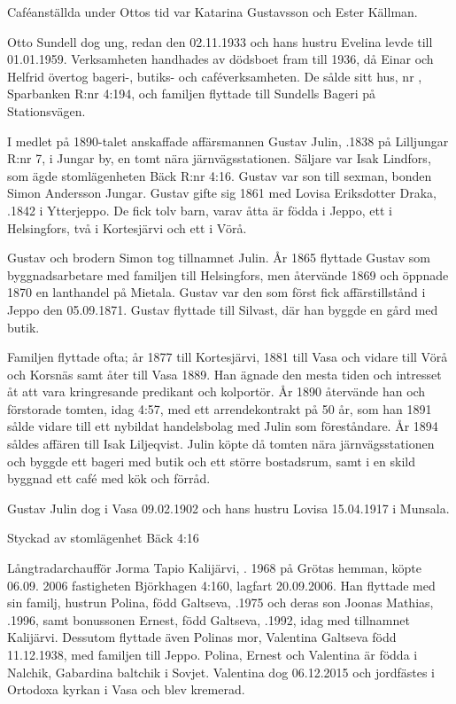 Caféanställda under Ottos tid var Katarina Gustavsson och Ester Källman.

Otto Sundell dog ung, redan den 02.11.1933 och hans hustru Evelina levde till 01.01.1959. Verksamheten handhades av dödsboet fram till 1936, då Einar och	Helfrid övertog bageri-, butiks- och caféverksamheten. De sålde sitt hus, nr , Sparbanken R:nr 4:194, och familjen flyttade till Sundells Bageri på Stationsvägen.


%
I medlet på 1890-talet anskaffade affärsmannen Gustav Julin, .1838 på Lilljungar R:nr 7, i Jungar by, en tomt nära järnvägsstationen. Säljare var Isak Lindfors, som ägde stomlägenheten Bäck R:nr 4:16. Gustav var son till sexman, bonden Simon Andersson Jungar. Gustav gifte sig 1861 med Lovisa Eriksdotter Draka, .1842 i Ytterjeppo. De fick tolv barn, varav åtta är födda i Jeppo, ett i Helsingfors, två i Kortesjärvi och ett i Vörå.

Gustav och brodern Simon tog tillnamnet Julin. År 1865 flyttade Gustav som byggnadsarbetare med familjen till Helsingfors, men återvände 1869 och öppnade 1870 en lanthandel på Mietala. Gustav var den som först fick affärstillstånd i Jeppo den 05.09.1871. Gustav flyttade till Silvast, där han byggde en gård med butik.

Familjen flyttade ofta; år 1877 till Kortesjärvi, 1881 till Vasa och vidare till Vörå och Korsnäs samt åter till Vasa 1889. Han ägnade den mesta tiden och intresset åt att vara kringresande predikant	och kolportör. År 1890 återvände han och förstorade tomten, idag 4:57,	med ett arrendekontrakt på 50 år, som han 1891 sålde vidare till ett nybildat handelsbolag med Julin som föreståndare. År 1894 såldes affären till Isak Liljeqvist. Julin köpte då tomten nära järnvägsstationen och byggde ett bageri med butik och ett större bostadsrum, samt i en skild byggnad ett café med kök och förråd.

Gustav Julin dog i Vasa 09.02.1902 och hans hustru Lovisa 15.04.1917 i Munsala.



%

Styckad av stomlägenhet Bäck 4:16


%
Långtradarchaufför Jorma Tapio Kalijärvi, . 1968 på Grötas hemman, köpte 06.09. 2006 fastigheten Björkhagen 4:160, lagfart 20.09.2006. Han flyttade med sin familj, hustrun Polina, född Galtseva, .1975 och deras son Joonas Mathias, .1996, samt bonussonen Ernest, född Galtseva, .1992, idag med tillnamnet Kalijärvi. Dessutom flyttade även Polinas mor, Valentina Galtseva  född 11.12.1938, med familjen till Jeppo. Polina, Ernest och Valentina är födda i Nalchik, Gabardina baltchik i Sovjet. Valentina dog 06.12.2015 och jordfästes i Ortodoxa kyrkan i Vasa och blev kremerad.


